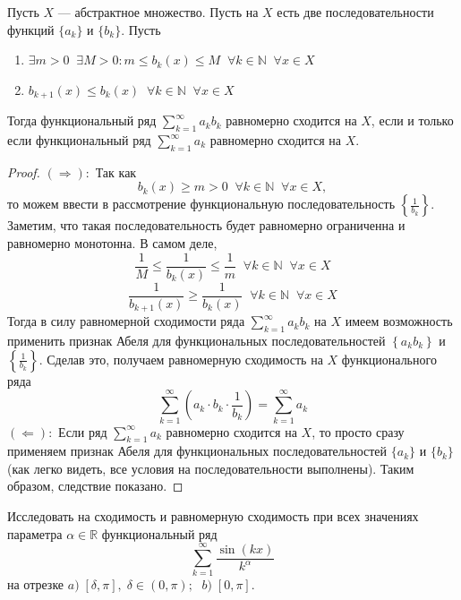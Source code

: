 \documentclass[11pt]{article}
\begin{document}
\begin{consequence}
    Пусть $X$ --- абстрактное множество. Пусть на $X$ есть две последовательности функций $\{a_k\}$ и $\{b_k\}$. Пусть 
    \begin{enumerate}
        \item $\exists m > 0 \; \; \exists M > 0 : m \leq b_k (x) \leq M \; \; \forall k \in \mathbb{N} \; \; \forall x \in X$
        \item $b_{k + 1} (x) \leq b_k (x) \; \; \forall k \in \mathbb{N} \; \; \forall x \in X$
    \end{enumerate}
    Тогда функциональный ряд $\displaystyle \sum_{k = 1}^{\infty} a_k b_k$ равномерно сходится на $X$, если и только если функциональный ряд $\displaystyle \sum_{k = 1}^{\infty} a_k$ равномерно сходится на $X$.
\end{consequence}

\begin{proof}
    $(\Longrightarrow):$ Так как 
    \[b_k (x) \geq m > 0 \; \; \forall k \in \mathbb{N} \; \; \forall x \in X,\]
    то можем ввести в рассмотрение функциональную последовательность $\left\{\frac{1}{b_k}\right\}$. Заметим, что такая последовательность будет равномерно ограниченна и равномерно монотонна. В самом деле,
    \[\frac{1}{M} \leq \frac{1}{b_k (x)} \leq \frac{1}{m} \; \; \forall k \in \mathbb{N} \; \; \forall x \in X\]
    \[\frac{1}{b_{k + 1} (x)} \geq \frac{1}{b_k (x)} \; \; \forall k \in \mathbb{N} \; \; \forall x \in X\]
    Тогда в силу равномерной сходимости ряда $\displaystyle \sum_{k = 1}^{\infty} a_k b_k$ на $X$ имеем возможность применить признак Абеля для функциональных последовательностей $\left\{a_k b_k\right\}$ и $\left\{\frac{1}{b_k}\right\}$. Сделав это, получаем равномерную сходимость на $X$ функционального ряда 
    \[\sum_{k = 1}^{\infty} \left( a_k \cdot b_k \cdot \frac{1}{b_k} \right) = \sum_{k = 1}^{\infty} a_k\]
    $(\Longleftarrow):$ Если ряд $\displaystyle \sum_{k = 1}^{\infty} a_k$ равномерно сходится на $X$, то просто сразу применяем признак Абеля для функциональных последовательностей $\{a_k\}$ и $\{b_k\}$ (как легко видеть, все условия на последовательности выполнены). Таким образом, следствие показано.
\end{proof}

\begin{example}
    Исследовать на сходимость и равномерную сходимость при всех значениях параметра $\alpha \in \mathbb{R}$ функциональный ряд
    \[\sum_{k = 1}^{\infty} \frac{\sin(kx)}{k^{\alpha}}\]
    на отрезке $a) \; [\delta, \pi], \; \delta \in (0, \pi);$ $\; b) \; [0, \pi]$.
\end{example}
\end{document}
